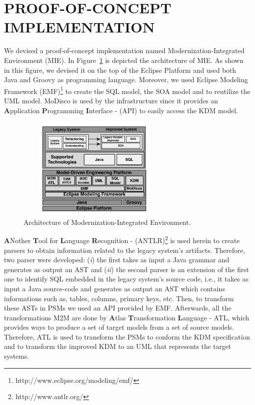 \documentclass[a4paper,twoside]{article}
\begin{document}
\section{\uppercase{Proof-of-concept implementation}}\label{sec:proof_of_concept_implementation}

\noindent We devised a proof-of-concept implementation named Modernization-Integrated Environment (MIE).
In Figure~\ref{fig:architecture} is depicted the architecture of MIE. As shown in this figure, we devised it on the top of the Eclipse Platform and used both Java and Groovy as programming language. Moreover, we used Eclipse Modeling Framework (EMF)\footnote{http://www.eclipse.org/modeling/emf/} to create the SQL model, the SOA model and to reutilize the UML model. MoDisco is used by the infrastructure since it provides an
\textbf{A}pplication \textbf{P}rogramming \textbf{I}nterface - (API) to easily access the KDM model. 

\begin{figure}[!h]
\centering
 \includegraphics[width=7.6cm, height=5cm]{Figuras/Arquitetura_da_Ferramenta}
\caption{Architecture of Modernization-Integrated Environment.}
\label{fig:architecture}
\end{figure}


\textbf{A}Nother \textbf{T}ool for \textbf{L}anguage \textbf{R}ecognition -  (ANTLR)\footnote{http://www.antlr.org/} is used herein to create parsers to obtain information related to the legacy system's artifacts. Therefore, two parser were developed: (\textit{i}) the first takes as input a Java grammar and generates as output an AST and (\textit{ii}) the second parser is an extension of the first one to identify SQL embedded in the legacy system's source code, i.e., it takes as input a Java source-code and generates as output an AST which contains informations such as, tables, columns, primary keys, etc. Then, to transform these ASTs in PSMs we used an API provided by EMF. Afterwards, all the transformations M2M are done by \textbf{A}tlas \textbf{T}ransformation \textbf{L}anguage - ATL, which provides ways to produce a set of target models from a set of source models. Therefore, ATL is used to transform the PSMs to conform the KDM specification and to transform the improved KDM to an UML that represents the target systems. 
\end{document}
